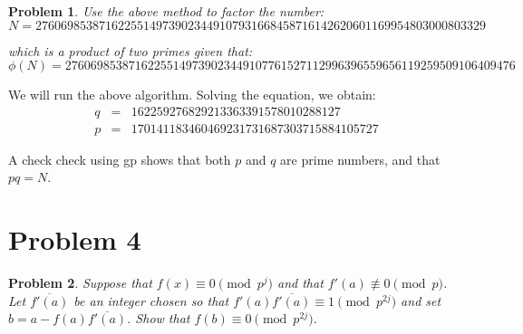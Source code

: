 \documentclass[psamsfonts]{amsart}
\newtheorem{prob}{Problem}[section]
\newenvironment{sol}{{\bfseries Solution}}{\qedsymbol}
\theoremstyle{definition}
\theoremstyle{remark}
\numberwithin{equation}{section}
\begin{document}
\begin{prob}
Use the above method to factor the number:
\begin{equation}
N = 27606985387162255149739023449107931668458716142620601169954803000803329
\end{equation}

which is a product of two primes given that:
\begin{equation}
\phi(N) = 27606985387162255149739023449107761527112996396559656119259509106409476
\end{equation}
\end{prob}

\begin{sol}
We will run the above algorithm. Solving the equation, we obtain:
\begin{eqnarray}
q &=& 162259276829213363391578010288127 \\
p &=& 170141183460469231731687303715884105727
\end{eqnarray}

A check check using gp shows that both $p$ and $q$ are prime numbers, and that $pq = N$. 
\end{sol}

\section{Problem 4}

\begin{prob}
Suppose that $f(x) \equiv 0 \pmod{p^j}$ and that $f'(a) \not \equiv 0 \pmod{p}$. Let $\overline{f'(a)}$ be an integer chosen so that $f'(a) \overline{f'(a)} \equiv 1 \pmod{ p^{2j}}$ and set $b= a - f(a) \overline{f'(a)}$. Show that $f(b) \equiv 0 \pmod{p^{2j}}$.
\end{prob}
\end{document}
